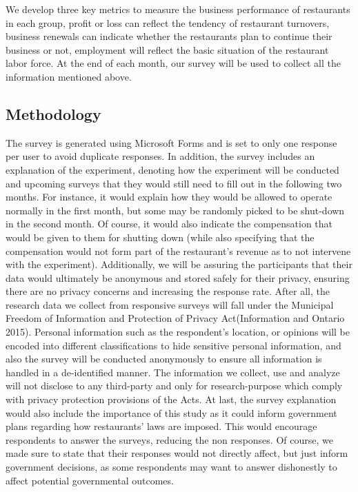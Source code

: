 \documentclass[
]{article}
\begin{document}
We develop three key metrics to measure the business performance of restaurants in each group, profit or loss can reflect the tendency of restaurant turnovers, business renewals can indicate whether the restaurants plan to continue their business or not, employment will reflect the basic situation of the restaurant labor force. At the end of each month, our survey will be used to collect all the information mentioned above.

\hypertarget{methodology}{%
\subsection{Methodology}\label{methodology}}

The survey is generated using Microsoft Forms and is set to only one response per user to avoid duplicate responses. In addition, the survey includes an explanation of the experiment, denoting how the experiment will be conducted and upcoming surveys that they would still need to fill out in the following two months. For instance, it would explain how they would be allowed to operate normally in the first month, but some may be randomly picked to be shut-down in the second month. Of course, it would also indicate the compensation that would be given to them for shutting down (while also specifying that the compensation would not form part of the restaurant's revenue as to not intervene with the experiment). Additionally, we will be assuring the participants that their data would ultimately be anonymous and stored safely for their privacy, ensuring there are no privacy concerns and increasing the response rate. After all, the research data we collect from responsive surveys will fall under the Municipal Freedom of Information and Protection of Privacy Act(Information and Ontario 2015). Personal information such as the respondent's location, or opinions will be encoded into different classifications to hide sensitive personal information, and also the survey will be conducted anonymously to ensure all information is handled in a de-identified manner. The information we collect, use and analyze will not disclose to any third-party and only for research-purpose which comply with privacy protection provisions of the Acts. At last, the survey explanation would also include the importance of this study as it could inform government plans regarding how restaurants' laws are imposed. This would encourage respondents to answer the surveys, reducing the non responses. Of course, we made sure to state that their responses would not directly affect, but just inform government decisions, as some respondents may want to answer dishonestly to affect potential governmental outcomes.
\end{document}
